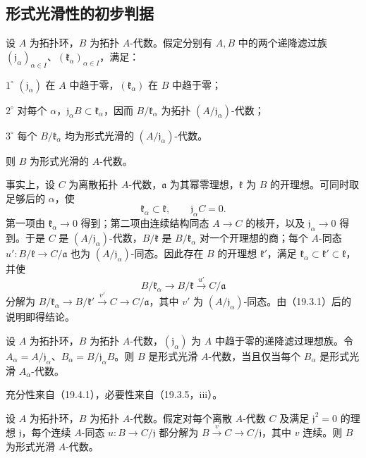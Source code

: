 \subsection{形式光滑性的初步判据}
设 $A$ 为拓扑环，$B$ 为拓扑 $A$-代数。假定分别有 $A,B$ 中的两个递降滤过族 $(\mathfrak j_\alpha)_{\alpha\in I}$、$(\mathfrak k_\alpha)_{\alpha\in I}$，满足：

$1^\circ$ $(\mathfrak j_\alpha)$ 在 $A$ 中趋于零，$(\mathfrak k_\alpha)$ 在 $B$ 中趋于零；

$2^\circ$ 对每个 $\alpha$，$\mathfrak j_\alpha B\subset\mathfrak k_\alpha$，因而 $B/\mathfrak k_\alpha$ 为拓扑 $(A/\mathfrak j_\alpha)$-代数；

$3^\circ$ 每个 $B/\mathfrak k_\alpha$ 均为形式光滑的 $(A/\mathfrak j_\alpha)$-代数。

则 $B$ 为形式光滑的 $A$-代数。

事实上，设 $C$ 为离散拓扑 $A$-代数，$\mathfrak a$ 为其幂零理想，$\mathfrak k$ 为 $B$ 的开理想。可同时取足够后的 $\alpha$，使
\[
 \mathfrak k_\alpha\subset\mathfrak k,
 \qquad\mathfrak j_\alpha C=0.
\]
第一项由 $\mathfrak k_\alpha\to0$ 得到；第二项由连续结构同态 $A\to C$ 的核开，以及 $\mathfrak j_\alpha\to0$ 得到。于是 $C$ 是 $(A/\mathfrak j_\alpha)$-代数，$B/\mathfrak k$ 是 $B/\mathfrak k_\alpha$ 对一个开理想的商；每个 $A$-同态 $u':B/\mathfrak k\to C/\mathfrak a$ 也为 $(A/\mathfrak j_\alpha)$-同态。因此存在 $B$ 的开理想 $\mathfrak k'$，满足 $\mathfrak k_\alpha\subset\mathfrak k'\subset\mathfrak k$，并使
\[
 B/\mathfrak k_\alpha\to B/\mathfrak k\xrightarrow{u'}C/\mathfrak a
\]
分解为 $B/\mathfrak k_\alpha\to B/\mathfrak k'\xrightarrow{v'}C\to C/\mathfrak a$，其中 $v'$ 为 $(A/\mathfrak j_\alpha)$-同态。由（19.3.1）后的说明即得结论。

设 $A$ 为拓扑环，$B$ 为拓扑 $A$-代数，$(\mathfrak j_\alpha)$ 为 $A$ 中趋于零的递降滤过理想族。令 $A_\alpha=A/\mathfrak j_\alpha$、$B_\alpha=B/\mathfrak j_\alpha B$。则 $B$ 是形式光滑 $A$-代数，当且仅当每个 $B_\alpha$ 是形式光滑 $A_\alpha$-代数。

充分性来自（19.4.1），必要性来自（19.3.5，iii）。

设 $A$ 为拓扑环，$B$ 为拓扑 $A$-代数。假定对每个离散 $A$-代数 $C$ 及满足 $\mathfrak j^2=0$ 的理想 $\mathfrak j$，每个连续 $A$-同态 $u:B\to C/\mathfrak j$ 都分解为 $B\xrightarrow{v}C\to C/\mathfrak j$，其中 $v$ 连续。则 $B$ 为形式光滑 $A$-代数。

